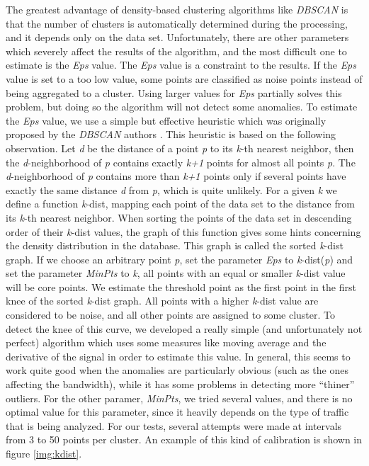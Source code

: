\documentclass[12pt,a4paper,cucitura]{toptesi}
\begin{document}
The greatest advantage of density-based clustering algorithms like \emph{DBSCAN} is that the number of clusters is automatically determined during the processing, and it depends only on the data set. 
Unfortunately, there are other parameters which severely affect the results of the algorithm, and the most difficult one to estimate is the \emph{Eps} value.
The \emph{Eps} value is a constraint to the results. If the \emph{Eps} value is set to a too low value, some points are classified as noise points instead of being aggregated to a cluster.
Using larger values for \emph{Eps} partially solves this problem, but doing so the algorithm will not detect some anomalies.
To estimate the \emph{Eps} value, we use a simple but effective heuristic which was originally proposed by the \emph{DBSCAN} authors \cite{dbscan}. 
This heuristic is based on the following observation. Let \emph{d} be the distance of a point \emph{p} to its \emph{k}-th nearest neighbor, then the \emph{d}-neighborhood of \emph{p} contains exactly \emph{k+1} points for almost all points \emph{p}.
The \emph{d}-neighborhood of \emph{p} contains more than \emph{k+1} points only if several points have exactly the same distance \emph{d} from \emph{p}, which is quite unlikely.
For a given \emph{k} we define a function \emph{k}-dist, mapping each point of the data set to the distance from its \emph{k}-th nearest neighbor. When sorting the points of the data set in descending order of their \emph{k}-dist values, the graph of this function gives some hints concerning the density distribution in the database. This graph is called the sorted \emph{k}-dist graph. If we choose an arbitrary point \emph{p}, set the parameter \emph{Eps} to \emph{k}-dist(\emph{p}) and set the parameter \emph{MinPts} to \emph{k}, all points with an equal or smaller \emph{k}-dist value will be core points. We estimate the threshold point as the first point in the first knee of the sorted \emph{k}-dist graph. All points with a higher \emph{k}-dist value are considered to be noise, and all other points are assigned to some cluster.
To detect the knee of this curve, we developed a really simple (and unfortunately not perfect) algorithm which uses some measures like moving average and the derivative of the signal in order to estimate this value. In general, this seems to work quite good when the anomalies are particularly obvious (such as the ones affecting the bandwidth), while it has some problems in detecting more ``thiner'' outliers.
For the other paramer, \emph{MinPts}, we tried several values, and there is no optimal value for this parameter, since it heavily depends on the type of traffic that is being analyzed.
For our tests, several attempts were made at intervals from 3 to 50 points per cluster.
An example of this kind of calibration is shown in figure \ref{img:kdist}.
\end{document}
